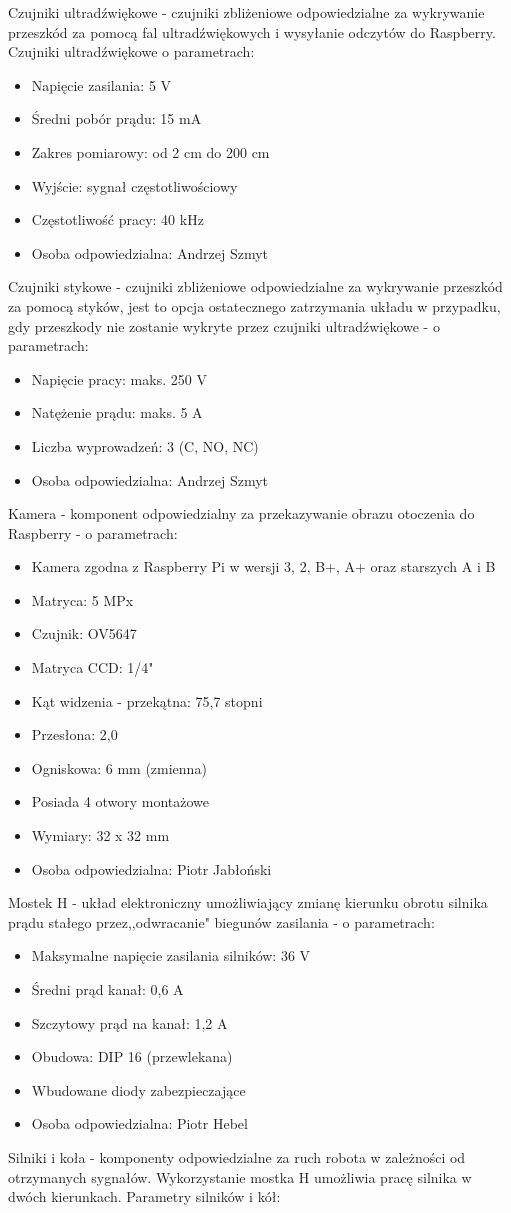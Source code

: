 \documentclass[a4paper]{article}
\begin{document}
\newpage
Czujniki ultradźwiękowe - czujniki zbliżeniowe odpowiedzialne za wykrywanie przeszkód za pomocą fal ultradźwiękowych i wysyłanie odczytów do Raspberry. Czujniki ultradźwiękowe o parametrach:
\begin{itemize}
\item Napięcie zasilania: 5 V
\item Średni pobór prądu: 15 mA
\item Zakres pomiarowy: od 2 cm do 200 cm
\item Wyjście: sygnał częstotliwościowy
\item Częstotliwość pracy: 40 kHz
\item Osoba odpowiedzialna: Andrzej Szmyt
\end{itemize}
Czujniki stykowe - czujniki zbliżeniowe odpowiedzialne za wykrywanie przeszkód za pomocą styków, jest to opcja ostatecznego zatrzymania układu w przypadku, gdy przeszkody nie zostanie wykryte przez czujniki ultradźwiękowe - o parametrach:
\begin{itemize}
\item Napięcie pracy: maks. 250 V
\item Natężenie prądu: maks. 5 A
\item Liczba wyprowadzeń: 3 (C, NO, NC)
\item Osoba odpowiedzialna: Andrzej Szmyt
\end{itemize}
Kamera - komponent odpowiedzialny za przekazywanie obrazu otoczenia do Raspberry - o parametrach:
\begin{itemize}
\item Kamera zgodna z Raspberry Pi w wersji 3, 2, B+, A+ oraz starszych A i B
\item Matryca: 5 MPx
\item Czujnik: OV5647
\item Matryca CCD: 1/4"
\item Kąt widzenia - przekątna: 75,7 stopni
\item Przesłona: 2,0
\item Ogniskowa: 6 mm (zmienna)
\item Posiada 4 otwory montażowe
\item Wymiary: 32 x 32 mm
\item Osoba odpowiedzialna: Piotr Jabłoński
\end{itemize}
Mostek H - układ elektroniczny umożliwiający zmianę kierunku obrotu silnika prądu stałego przez,,odwracanie" biegunów zasilania - o parametrach:
\begin{itemize}
\item Maksymalne napięcie zasilania silników: 36 V
\item Średni prąd kanał: 0,6 A
\item Szczytowy prąd na kanał: 1,2 A
\item Obudowa: DIP 16 (przewlekana)
\item Wbudowane diody zabezpieczające
\item Osoba odpowiedzialna: Piotr Hebel
\end{itemize}
\newpage
Silniki i koła - komponenty odpowiedzialne za ruch robota w zależności od otrzymanych sygnałów.
Wykorzystanie mostka H umożliwia pracę silnika w dwóch kierunkach. Parametry silników i kół:
\end{document}
